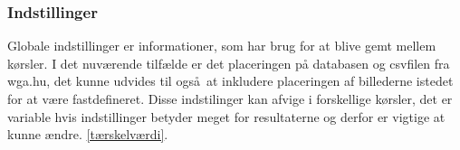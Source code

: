{\subsubsection{Indstillinger}
Globale indstillinger er informationer, som har brug for at blive gemt
mellem kørsler. I det nuværende tilfælde er det placeringen på databasen og
csvfilen fra wga.hu, det kunne udvides til også at inkludere placeringen
af billederne istedet for at være fastdefineret.
Disse indstilinger kan afvige i forskellige kørsler, det er variable
hvis indstillinger betyder meget for resultaterne og derfor er vigtige
at kunne ændre.
\ref{tærskelværdi}.   
}
